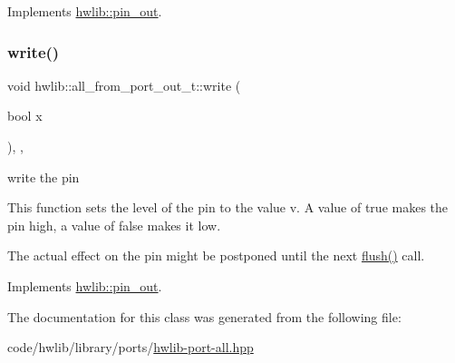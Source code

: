 Implements \hyperlink{classhwlib_1_1pin__out_ac22910317477a52431a44e7e3c66fc57}{hwlib\+::pin\+\_\+out}.

\mbox{\label{classhwlib_1_1all__from__port__out__t_ad062b586a43e257a4e7fa14ba3ce7d21}} 
\subsubsection{\texorpdfstring{write()}{write()}}
{\footnotesize\ttfamily void hwlib\+::all\+\_\+from\+\_\+port\+\_\+out\+\_\+t\+::write (\begin{DoxyParamCaption}\item[{bool}]{x }\end{DoxyParamCaption})\hspace{0.3cm}{\ttfamily [inline]}, {\ttfamily [override]}, {\ttfamily [virtual]}}





write the pin

This function sets the level of the pin to the value v. A value of true makes the pin high, a value of false makes it low.

The actual effect on the pin might be postponed until the next \hyperlink{classhwlib_1_1all__from__port__out__t_aa98ee6cecc0f87b153f5aea8b2967f21}{flush()} call. 

Implements \hyperlink{classhwlib_1_1pin__out_a8d260a70e503dcfb81987c408e170300}{hwlib\+::pin\+\_\+out}.



The documentation for this class was generated from the following file\+:\begin{DoxyCompactItemize}
\item 
code/hwlib/library/ports/\hyperlink{hwlib-port-all_8hpp}{hwlib-\/port-\/all.\+hpp}\end{DoxyCompactItemize}
